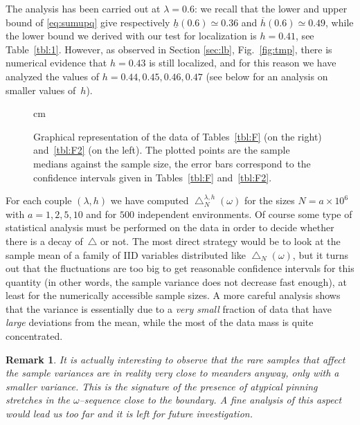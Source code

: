 \documentclass[reqno,11pt]{amsart}
\numberwithin{equation}{section}
\newtheorem{rem}[theorem]{Remark}
\newcommand{\go}{\omega}
\newcommand{\gl}{\lambda}
\begin{document}
\smallskip

The analysis has been carried out at $\gl=0.6$: we recall that the lower and upper bound of \eqref{eq:sumupq} give respectively $\underline h(0.6) \simeq 0.36$ and $\overline h(0.6) \simeq 0.49$, while the lower bound we derived with our  test for localization is $h=0.41$, see Table~\ref{tbl:1}. However,
as observed in Section \ref{sec:lb}, Fig.~\ref{fig:tmp}, there is numerical evidence that $h=0.43$ is still localized, and for this reason  we have analyzed the values of $h=0.44, 0.45, 0.46, 0.47$ (see below for an analysis on smaller values of~$h$).


\begin{figure}[h]
\begin{center}
\leavevmode
{} cm
\end{center}
\caption{
\label{fig:F}
Graphical representation of the data of Tables~\ref{tbl:F} (on the right) and~\ref{tbl:F2} (on the left). The plotted points are the sample medians against the sample size, the error bars correspond to the confidence intervals given in Tables~\ref{tbl:F} and~\ref{tbl:F2}.
}
\end{figure}


For each couple $(\gl, h)$ we have computed $\bigtriangleup _{N}^{\gl,h}(\go)$ for the sizes $N=a\times 10^6$ with $a=1,2,5,10$ and for $500$ independent environments. Of course some type of statistical analysis must be performed on the data in order to decide whether there is a decay of~$\bigtriangleup $ or not. The most direct strategy would be to look at the sample mean of
a family of IID variables distributed like $\bigtriangleup _N(\go)$, but it turns out that the fluctuations are too big to get reasonable confidence intervals for this quantity (in other words, the sample variance does not decrease fast enough), at least for the numerically accessible sample sizes. A more careful analysis shows that the variance is essentially due to a \textsl{very small} fraction of data that have \textsl{large} deviations from the mean, while the most of the data mass is quite concentrated.

\smallskip
\begin{rem}\rm
It is actually interesting to observe that the rare samples
that {\sl affect} the sample  variances are in reality very close to meanders
anyway, only with a smaller variance. This is the signature of the presence
of atypical pinning stretches in the $\go$--sequence close to the boundary.
A fine analysis of this aspect would lead us too far and it is left for 
future investigation.
\end{rem}
\smallskip
\end{document}
